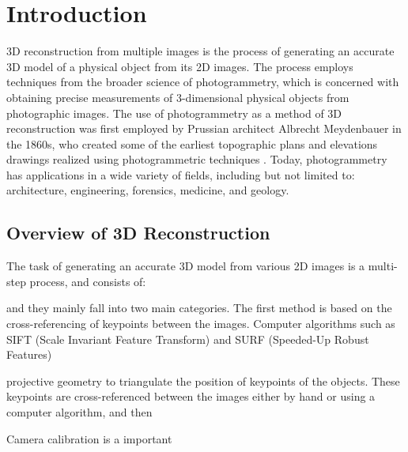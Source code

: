 \section{Introduction}

3D reconstruction from multiple images is the process of generating an accurate 3D model of a physical object from its 2D images. The process employs techniques from the broader science of photogrammetry, which is concerned with obtaining precise measurements of 3-dimensional physical objects from photographic images. The use of photogrammetry as a method of 3D reconstruction was first employed by Prussian architect Albrecht Meydenbauer in the 1860s, who created some of the earliest topographic plans and elevations drawings realized using photogrammetric techniques \autocite{ices2017}. Today, photogrammetry has applications in a wide variety of fields, including but not limited to: architecture, engineering, forensics, medicine, and geology.

\subsection{Overview of 3D Reconstruction}



The task of generating an accurate 3D model from various 2D images is a multi-step process, and consists of:




and they mainly fall into two main categories. The first method is based on the cross-referencing of keypoints between the images. Computer algorithms such as SIFT (Scale Invariant Feature Transform) and SURF (Speeded-Up Robust Features)

projective geometry to triangulate the position of keypoints of the objects. These keypoints are cross-referenced between the images either by hand or using a computer algorithm, and then


Camera calibration is a important







